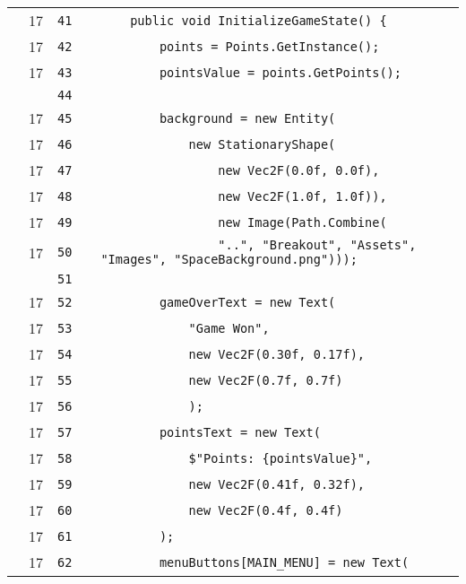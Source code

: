 \documentclass[a4paper,landscape,10pt]{article}
\begin{document}
\begin{longtable}[l]{lrrll}
\cellcolor{green} & 17 & \verb~41~ & & \verb~    public void InitializeGameState() {~\\
\cellcolor{green} & 17 & \verb~42~ & & \verb~        points = Points.GetInstance();~\\
\cellcolor{green} & 17 & \verb~43~ & & \verb~        pointsValue = points.GetPoints();~\\
\cellcolor{gray} &  & \verb~44~ & & \verb~~\\
\cellcolor{green} & 17 & \verb~45~ & & \verb~        background = new Entity(~\\
\cellcolor{green} & 17 & \verb~46~ & & \verb~            new StationaryShape(~\\
\cellcolor{green} & 17 & \verb~47~ & & \verb~                new Vec2F(0.0f, 0.0f),~\\
\cellcolor{green} & 17 & \verb~48~ & & \verb~                new Vec2F(1.0f, 1.0f)),~\\
\cellcolor{green} & 17 & \verb~49~ & & \verb~                new Image(Path.Combine(~\\
\cellcolor{green} & 17 & \verb~50~ & & \verb~                "..", "Breakout", "Assets", "Images", "SpaceBackground.png")));~\\
\cellcolor{gray} &  & \verb~51~ & & \verb~~\\
\cellcolor{green} & 17 & \verb~52~ & & \verb~        gameOverText = new Text(~\\
\cellcolor{green} & 17 & \verb~53~ & & \verb~            "Game Won",~\\
\cellcolor{green} & 17 & \verb~54~ & & \verb~            new Vec2F(0.30f, 0.17f),~\\
\cellcolor{green} & 17 & \verb~55~ & & \verb~            new Vec2F(0.7f, 0.7f)~\\
\cellcolor{green} & 17 & \verb~56~ & & \verb~            );~\\
\cellcolor{green} & 17 & \verb~57~ & & \verb~        pointsText = new Text(~\\
\cellcolor{green} & 17 & \verb~58~ & & \verb~            $"Points: {pointsValue}",~\\
\cellcolor{green} & 17 & \verb~59~ & & \verb~            new Vec2F(0.41f, 0.32f),~\\
\cellcolor{green} & 17 & \verb~60~ & & \verb~            new Vec2F(0.4f, 0.4f)~\\
\cellcolor{green} & 17 & \verb~61~ & & \verb~        );~\\
\cellcolor{green} & 17 & \verb~62~ & & \verb~        menuButtons[MAIN_MENU] = new Text(~\\

\end{longtable}
\end{document}
